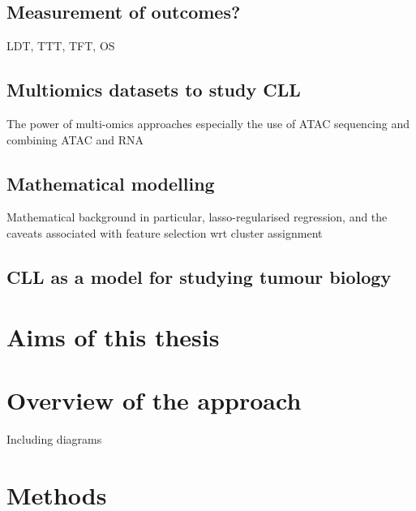 \documentclass[11pt, a4paper, twosided]{book}
\begin{document}
\hypertarget{measurement-of-outcomes}{%
\section{Measurement of outcomes?}\label{measurement-of-outcomes}}

LDT, TTT, TFT, OS

\hypertarget{multiomics-datasets-to-study-cll}{%
\section{Multiomics datasets to study CLL}\label{multiomics-datasets-to-study-cll}}

The power of multi-omics approaches especially the use of ATAC sequencing and combining ATAC and RNA

\hypertarget{mathematical-modelling}{%
\section{Mathematical modelling}\label{mathematical-modelling}}

Mathematical background in particular, lasso-regularised regression, and the caveats associated with feature selection
wrt cluster assignment

\hypertarget{cll-as-a-model-for-studying-tumour-biology}{%
\section{CLL as a model for studying tumour biology}\label{cll-as-a-model-for-studying-tumour-biology}}

\hypertarget{aims-of-this-thesis}{%
\chapter{Aims of this thesis}\label{aims-of-this-thesis}}

\hypertarget{overview-of-the-approach}{%
\chapter{Overview of the approach}\label{overview-of-the-approach}}

Including diagrams

\hypertarget{methods}{%
\chapter{Methods}\label{methods}}
\end{document}
